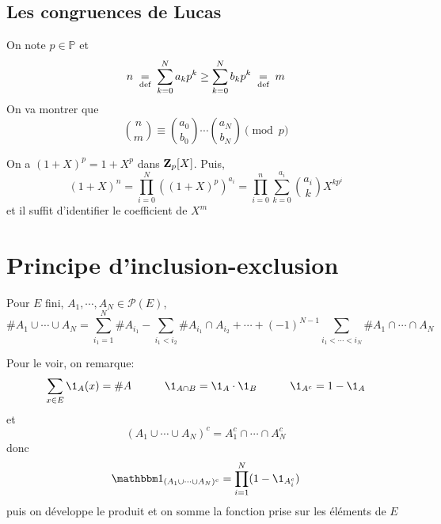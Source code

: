 \subsection{Les congruences de Lucas}

On note $p\in\mathbb P$ et \[
    n\;\underset{\text{def}}=\;\sum_{k=0}^Na_kp^k\geq \sum_{k=0}^Nb_kp^k\;\underset{\text{def}}=\; m
\]
On va montrer que \[
    \binom nm\equiv \binom{a_0}{b_0}\cdots \binom{a_N}{b_N}\pmod p
\]

On a $(1+X)^p=1+X^p$ dans $\mathbf Z_p[X]$. Puis, \[
    (1+X)^n=\prod_{i=0}^N((1+X)^p)^{a_i}=\prod_{i=0}^n\sum_{k=0}^{a_i}\binom{a_i}{k}X^{kp^i}
\]
et il suffit d'identifier le coefficient de $X^m$

\section{Principe d'inclusion-exclusion}

Pour $E$ fini, $A_1, \cdots, A_N\in\mathcal P(E)$, \[
    \#A_1\cup\cdots \cup A_N=\sum_{i_1=1}^N\#A_{i_1}-\sum_{i_1<i_2}\#A_{i_1}\cap A_{i_2}+\cdots +(-1)^{N-1}\sum_{i_1<\cdots <i_N}\#A_1\cap \cdots \cap A_N
\]

Pour le voir, on remarque: \[
    \sum_{x\in E}\1_{A}(x)=\#A \qquad\quad \1_{A\cap B}=\1_A \cdot \1_B \qquad \quad \1_{A^c}=1-\1_A
\]
et \[
    (A_1\cup \cdots \cup A_N)^c=A_1^c\cap \cdots \cap A_N^c
\]
donc \[
    \mathbbm1_{(A_1\cup \cdots \cup A_N)^c}=\prod_{i=1}^N(1-\1_{A_i^c})
\]
puis on développe le produit et on somme la fonction prise sur les éléments de $E$



